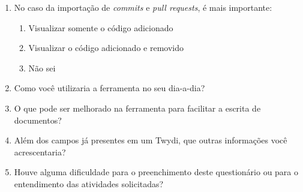 \begin{enumerate}
  \item No caso da importação de \textit{commits} e \textit{pull requests}, é mais importante:
    \begin{enumerate}[i]
      \item Visualizar somente o código adicionado
      \item Visualizar o código adicionado e removido
      \item Não sei
    \end{enumerate}

  \item Como você utilizaria a ferramenta no seu dia-a-dia?

  \item O que pode ser melhorado na ferramenta para facilitar a escrita de documentos?

  \item Além dos campos já presentes em um Twydi, que outras informações você acrescentaria?

  \item Houve alguma dificuldade para o preenchimento deste questionário ou para o entendimento das atividades solicitadas?
\end{enumerate}
